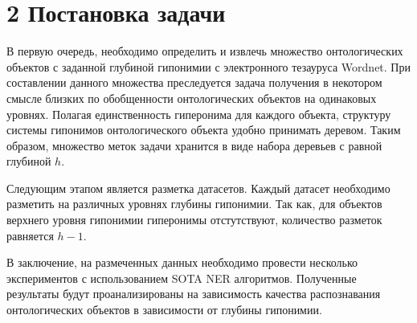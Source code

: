 \documentclass[12pt,twoside]{article}
\begin{document}
\section{2 Постановка задачи} 
{
    В первую очередь, необходимо определить и извлечь множество онтологических объектов с заданной глубиной гипонимии с электронного тезауруса Wordnet. При составлении данного множества преследуется задача получения в некотором смысле близких по обобщенности онтологических объектов на одинаковых уровнях. Полагая единственность гиперонима для каждого объекта, структуру системы гипонимов онтологического объекта удобно принимать деревом. Таким образом, множество меток задачи хранится в виде набора деревьев с равной глубиной $h$. 
    
    Следующим этапом является разметка датасетов. Каждый датасет необходимо разметить на различных уровнях глубины гипонимии. Так как, для объектов верхнего уровня гипонимии гиперонимы отстутствуют, количество разметок равняется $h-1$.
    
    В заключение, на размеченных данных необходимо провести несколько экспериментов с использованием SOTA NER алгоритмов. Полученные результаты будут проанализированы на зависимость качества распознавания онтологических объектов в зависимости от глубины гипонимии. }
\bigskip
\bigskip
\bigskip

\end{document}

